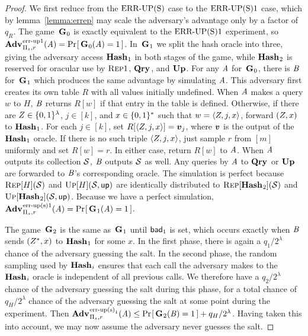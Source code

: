 \begin{proof} We first reduce from the $\textnormal{ERR\mbox{-}UP(S)}$ case to the $\textnormal{ERR\mbox{-}UP(S)}1$ case, which by lemma~\ref{lemma:errep} may scale the adversary's advantage only by a factor of $q_R$. The game~$\mathbf{G}\hspace{0.5pt}_0$ is exactly equivalent to the $\textnormal{ERR\mbox{-}UP(S)}1$ experiment, so $\Adv{\errep1}_{\struct_s,r}(\advA) = \Prob{\game_0(\advA) = 1}$. In~$\mathbf{G}\hspace{0.5pt}_1$ we split the hash oracle into three, giving the adversary access $\mathbf{Hash}\hspace{0.5pt}_1$ in both stages of the game, while $\mathbf{Hash}\hspace{0.5pt}_2$ is reserved for oracular use by $\textsc{Rep}1$, $\mathbf{Qry}\hspace{0.5pt}$, and $\mathbf{Up}\hspace{0.5pt}$. For any $\mathit{A}$ for~$\mathbf{G}\hspace{0.5pt}_0$, there is $\mathit{B}$ for~$\mathbf{G}\hspace{0.5pt}_1$ which produces the same advantage by simulating $\mathit{A}$. This adversary first creates its own table $R$ with all values initially undefined. When $\mathit{A}$ makes a query $w$ to $H$, $\mathit{B}$ returns $R[w]$ if that entry in the table is defined. Otherwise, if there are $Z \in \{0,1\}^\lambda$, $j \in [k]$, and $x \in \{0,1\}^*$ such that $w = \langle Z, j, x\rangle$, forward $(Z,x)$ to $\mathbf{Hash}\hspace{0.5pt}_1$. For each $j \in [k]$, set $R[\langle\salt, j, x\rangle] = \vv_j$, where $\vv$ is the output of the $\mathbf{Hash}\hspace{0.5pt}_1$ oracle. If there is no such triple $\langle Z, j, x\rangle$, just sample $r$ from $[m]$ uniformly and set $R[w] = r$. In either case, return $R[w]$ to $\mathit{A}$. When $\mathit{A}$ outputs its collection $\mathcal{S}$, $\mathit{B}$ outputs $\mathcal{S}$ as well. Any queries by $\mathit{A}$ to $\mathbf{Qry}\hspace{0.5pt}$ or $\mathbf{Up}\hspace{0.5pt}$ are forwarded to $\mathit{B}$'s corresponding oracle. The simulation is perfect because $\textsc{Rep}[H](\mathcal{S})$ and $\textsc{Up}[H](\mathcal{S},\mathsf{up})$ are identically distributed to $\textsc{Rep}[\mathbf{Hash}\hspace{0.5pt}_2](\mathcal{S})$ and $\textsc{Up}[\mathbf{Hash}\hspace{0.5pt}_2](\mathcal{S},\mathsf{up})$. Because we have a perfect simulation, $\Adv{\erreps1}_{\struct_s,r}(\advA) = \Prob{\game_1(\advA) = 1}$.

The game~$\mathbf{G}\hspace{0.5pt}_2$ is the same as~$\mathbf{G}\hspace{0.5pt}_1$ until $\mathsf{bad}_1$ is set, which occurs exactly when $\mathit{B}$ sends $(Z^*,x)$ to $\mathbf{Hash}\hspace{0.5pt}_1$ for some $x$. In the first phase, there is again a $q_1/2^\lambda$ chance of the adversary guessing the salt. In the second phase, the random sampling used by $\mathbf{Hash}\hspace{0.5pt}_i$ ensures that each call the adversary makes to the $\mathbf{Hash}\hspace{0.5pt}_i$ oracle is independent of all previous calls. We therefore have a $q_2/2^\lambda$ chance of the adversary guessing the salt during this phase, for a total chance of $q_H/2^\lambda$ chance of the adversary guessing the salt at some point during the experiment. Then $\Adv{\erreps_1}_{\struct_s,r}(\advA) \le \Prob{\game_2(\advB) = 1} + q_H/2^\lambda$. Having taken this into account, we may now assume the adversary never guesses the salt.


\end{proof}
